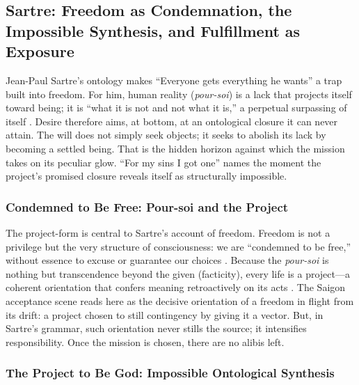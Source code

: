 \subsection*{Sartre: Freedom as Condemnation, the Impossible Synthesis, and Fulfillment as
	Exposure}
\label{ssec:iii-sartre}
Jean-Paul Sartre's ontology makes ``Everyone gets everything he wants'' a trap built into
freedom. For him, human reality (\emph{pour-soi}) is a lack that projects itself toward being;
it is ``what
it is not and not what it is,'' a perpetual surpassing of itself
\parencite[pp.~100--110]{SartreBN2003}. Desire therefore aims, at bottom, at an ontological
closure it can never attain. The will does not simply seek objects; it seeks to abolish its
lack by becoming a settled being. That is the hidden horizon against which the mission takes on
its peculiar glow. ``For my sins I got one'' names the moment the project's promised closure
reveals itself as structurally impossible.

\subsubsection*{Condemned to Be Free: Pour-soi and the Project}

The project-form is central to Sartre's account of freedom. Freedom is not a privilege but the
very structure of consciousness: we are ``condemned to be free,'' without essence to excuse or
guarantee our choices \parencite[pp.~34--36]{SartreBN2003}. Because the \emph{pour-soi} is
nothing but transcendence beyond the given (facticity), every life is a project—a coherent
orientation that confers meaning retroactively on its acts
\parencite[pp.~561--569]{SartreBN2003}. The Saigon acceptance scene reads here as the decisive
orientation of a freedom in flight from its drift: a project chosen to still contingency by
giving it a vector. But, in Sartre's grammar, such orientation never stills the source; it
intensifies responsibility. Once the mission is chosen, there are no alibis left.

\subsubsection*{The Project to Be God: Impossible Ontological Synthesis}

